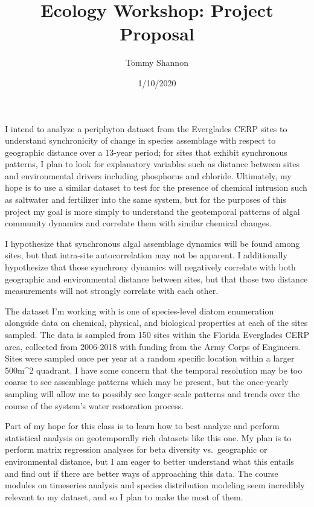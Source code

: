 \documentclass[]{article}
\title{Ecology Workshop: Project Proposal}
\author{Tommy Shannon}
\date{1/10/2020}
\begin{document}
\maketitle

I intend to analyze a periphyton dataset from the Everglades CERP sites
to understand synchronicity of change in species assemblage with respect
to geographic distance over a 13-year period; for sites that exhibit
synchronous patterns, I plan to look for explanatory variables such as
distance between sites and environmental drivers including phosphorus
and chloride. Ultimately, my hope is to use a similar dataset to test
for the presence of chemical intrusion such as saltwater and fertilizer
into the same system, but for the purposes of this project my goal is
more simply to understand the geotemporal patterns of algal community
dynamics and correlate them with similar chemical changes.

I hypothesize that synchronous algal assemblage dynamics will be found
among sites, but that intra-site autocorrelation may not be apparent. I
additionally hypothesize that those synchrony dynamics will negatively
correlate with both geographic and environmental distance between sites,
but that those two distance measurements will not strongly correlate
with each other.

The dataset I'm working with is one of species-level diatom enumeration
alongside data on chemical, physical, and biological properties at each
of the sites sampled. The data is sampled from 150 sites within the
Florida Everglades CERP area, collected from 2006-2018 with funding from
the Army Corps of Engineers. Sites were sampled once per year at a
random specific location within a larger 500m\^{}2 quadrant. I have some
concern that the temporal resolution may be too coarse to see assemblage
patterns which may be present, but the once-yearly sampling will allow
me to possibly see longer-scale patterns and trends over the course of
the system's water restoration process.

Part of my hope for this class is to learn how to best analyze and
perform statistical analysis on geotemporally rich datasets like this
one. My plan is to perform matrix regression analyses for beta diversity
vs.~geographic or environmental distance, but I am eager to better
understand what this entails and find out if there are better ways of
approaching this data. The course modules on timeseries analysis and
species distribution modeling seem incredibly relevant to my dataset,
and so I plan to make the most of them.
\end{document}
